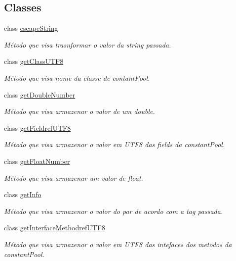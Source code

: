 \subsection*{Classes}
\begin{DoxyCompactItemize}
\item 
class \hyperlink{classCPInfo_1_1escapeString}{escape\+String}
\begin{DoxyCompactList}\small\item\em Método que visa trasnformar o valor da string passada. \end{DoxyCompactList}\item 
class \hyperlink{classCPInfo_1_1getClassUTF8}{get\+Class\+U\+T\+F8}
\begin{DoxyCompactList}\small\item\em Método que visa nome da classe de contant\+Pool. \end{DoxyCompactList}\item 
class \hyperlink{classCPInfo_1_1getDoubleNumber}{get\+Double\+Number}
\begin{DoxyCompactList}\small\item\em Método que visa armazenar o valor de um double. \end{DoxyCompactList}\item 
class \hyperlink{classCPInfo_1_1getFieldrefUTF8}{get\+Fieldref\+U\+T\+F8}
\begin{DoxyCompactList}\small\item\em Método que visa armazenar o valor em U\+T\+F8 das fields da constant\+Pool. \end{DoxyCompactList}\item 
class \hyperlink{classCPInfo_1_1getFloatNumber}{get\+Float\+Number}
\begin{DoxyCompactList}\small\item\em Método que visa armazenar um valor de float. \end{DoxyCompactList}\item 
class \hyperlink{classCPInfo_1_1getInfo}{get\+Info}
\begin{DoxyCompactList}\small\item\em Método que visa armazenar o valor do par de acordo com a tag passada. \end{DoxyCompactList}\item 
class \hyperlink{classCPInfo_1_1getInterfaceMethodrefUTF8}{get\+Interface\+Methodref\+U\+T\+F8}
\begin{DoxyCompactList}\small\item\em Método que visa armazenar o valor em U\+T\+F8 das intefaces dos metodos da constant\+Pool. \end{DoxyCompactList}\item 

\end{DoxyCompactItemize}

